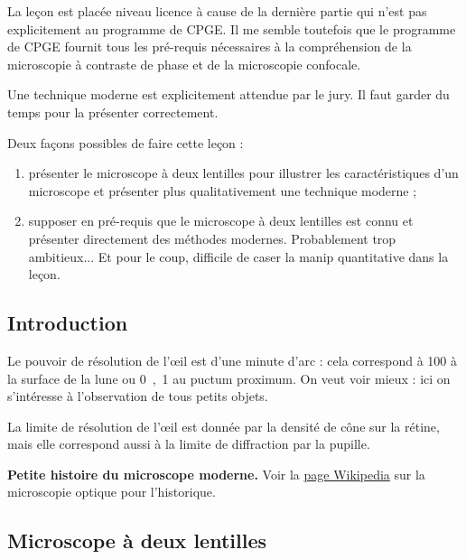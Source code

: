 \begin{remarque}
La leçon est placée niveau licence à cause de la dernière partie qui n'est pas explicitement au programme de CPGE.
Il me semble toutefois que le programme de CPGE fournit tous les pré-requis nécessaires à la compréhension de la microscopie à contraste de phase et de la microscopie confocale.

\noindent
Une technique moderne est explicitement attendue par le jury.
Il faut garder du temps pour la présenter correctement.

\noindent
Deux façons possibles de faire cette leçon :
\begin{enumerate}
\item présenter le microscope à deux lentilles pour illustrer les caractéristiques d'un microscope et présenter plus qualitativement une technique moderne ;
\item supposer en pré-requis que le microscope à deux lentilles est connu et présenter directement des méthodes modernes.
Probablement trop ambitieux...
Et pour le coup, difficile de caser la manip quantitative dans la leçon.
\end{enumerate}
\end{remarque}

\subsection*{Introduction}

Le pouvoir de résolution de l'œil est d'une minute d'arc : cela correspond à \unit{100}{\kilo\meter} à la surface de la lune ou \unit{0{,}1}{\milli\meter} au puctum proximum.
On veut voir mieux : ici on s'intéresse à l'observation de tous petits objets.

\begin{remarque}
La limite de résolution de l'œil est donnée par la densité de cône sur la rétine, mais elle correspond aussi à la limite de diffraction par la pupille.
\end{remarque}

\begin{slide}
\textbf{Petite histoire du microscope moderne.}
Voir la \href{https://fr.wikipedia.org/wiki/Microscope_optique}{page Wikipedia} sur la microscopie optique pour l'historique.
\end{slide}

\subsection{Microscope à deux lentilles}

